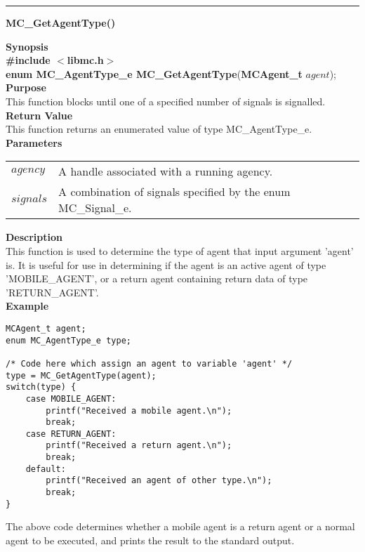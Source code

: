 \noindent
\vspace{5pt}
\rule{6.5in}{0.015in}
\noindent
{\LARGE \bf MC\_GetAgentType()}\\
{}

\noindent
{\bf Synopsis}\\
{\bf \#include $<$libmc.h$>$}\\
{\bf enum MC\_AgentType\_e MC\_GetAgentType}({\bf MCAgent\_t} $agent$);\\

\noindent
{\bf Purpose}\\
This function blocks until one of a specified number of signals is signalled.\\

\noindent
{\bf Return Value}\\
This function returns an enumerated value of type MC\_AgentType\_e.\\

\noindent
{\bf Parameters}
\vspace{-0.1in}
\begin{description}
\item               
\begin{tabular}{p{10 mm}p{145 mm}}
$agency$ & A handle associated with a running agency.\\ 
$signals$ & A combination of signals specified by the enum MC\_Signal\_e.
\end{tabular}
\end{description}

\noindent
{\bf Description}\\
This function is used to determine the type of agent that input argument 
'agent' is.
It is useful for use in determining if the agent is an active agent of type 
'MOBILE\_AGENT', or a return agent containing return data of type 
'RETURN\_AGENT'.\\

\noindent
{\bf Example}\\
\begin{verbatim}
MCAgent_t agent;
enum MC_AgentType_e type;

/* Code here which assign an agent to variable 'agent' */
type = MC_GetAgentType(agent);
switch(type) {
    case MOBILE_AGENT:
        printf("Received a mobile agent.\n");
        break;
    case RETURN_AGENT:
        printf("Received a return agent.\n");
        break;
    default:
        printf("Received an agent of other type.\n");
        break;
}
\end{verbatim}
\noindent
The above code determines whether a mobile agent is a return agent or a 
normal agent to be executed, and prints the result to the standard output.\\

